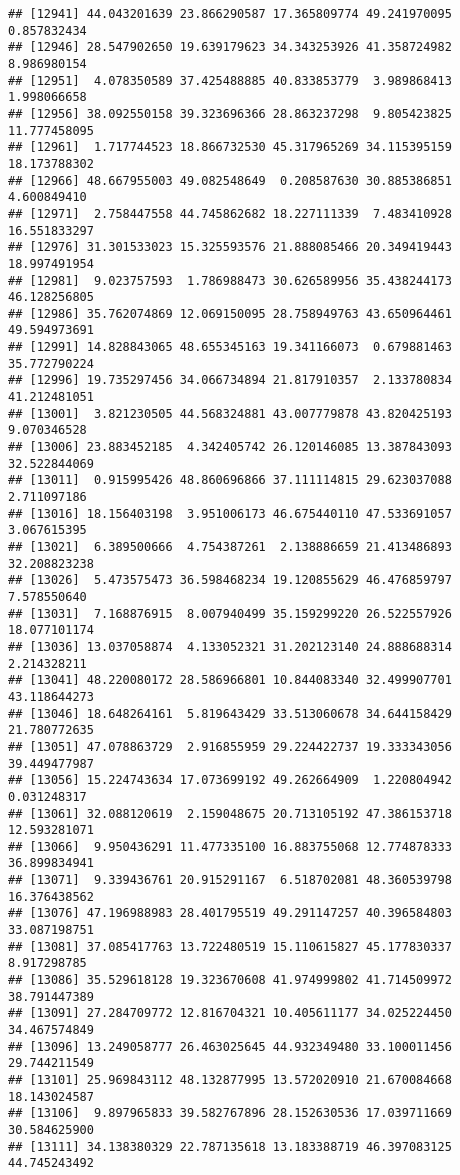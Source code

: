\documentclass[
]{article}
\begin{document}
\begin{verbatim}
## [12941] 44.043201639 23.866290587 17.365809774 49.241970095  0.857832434
## [12946] 28.547902650 19.639179623 34.343253926 41.358724982  8.986980154
## [12951]  4.078350589 37.425488885 40.833853779  3.989868413  1.998066658
## [12956] 38.092550158 39.323696366 28.863237298  9.805423825 11.777458095
## [12961]  1.717744523 18.866732530 45.317965269 34.115395159 18.173788302
## [12966] 48.667955003 49.082548649  0.208587630 30.885386851  4.600849410
## [12971]  2.758447558 44.745862682 18.227111339  7.483410928 16.551833297
## [12976] 31.301533023 15.325593576 21.888085466 20.349419443 18.997491954
## [12981]  9.023757593  1.786988473 30.626589956 35.438244173 46.128256805
## [12986] 35.762074869 12.069150095 28.758949763 43.650964461 49.594973691
## [12991] 14.828843065 48.655345163 19.341166073  0.679881463 35.772790224
## [12996] 19.735297456 34.066734894 21.817910357  2.133780834 41.212481051
## [13001]  3.821230505 44.568324881 43.007779878 43.820425193  9.070346528
## [13006] 23.883452185  4.342405742 26.120146085 13.387843093 32.522844069
## [13011]  0.915995426 48.860696866 37.111114815 29.623037088  2.711097186
## [13016] 18.156403198  3.951006173 46.675440110 47.533691057  3.067615395
## [13021]  6.389500666  4.754387261  2.138886659 21.413486893 32.208823238
## [13026]  5.473575473 36.598468234 19.120855629 46.476859797  7.578550640
## [13031]  7.168876915  8.007940499 35.159299220 26.522557926 18.077101174
## [13036] 13.037058874  4.133052321 31.202123140 24.888688314  2.214328211
## [13041] 48.220080172 28.586966801 10.844083340 32.499907701 43.118644273
## [13046] 18.648264161  5.819643429 33.513060678 34.644158429 21.780772635
## [13051] 47.078863729  2.916855959 29.224422737 19.333343056 39.449477987
## [13056] 15.224743634 17.073699192 49.262664909  1.220804942  0.031248317
## [13061] 32.088120619  2.159048675 20.713105192 47.386153718 12.593281071
## [13066]  9.950436291 11.477335100 16.883755068 12.774878333 36.899834941
## [13071]  9.339436761 20.915291167  6.518702081 48.360539798 16.376438562
## [13076] 47.196988983 28.401795519 49.291147257 40.396584803 33.087198751
## [13081] 37.085417763 13.722480519 15.110615827 45.177830337  8.917298785
## [13086] 35.529618128 19.323670608 41.974999802 41.714509972 38.791447389
## [13091] 27.284709772 12.816704321 10.405611177 34.025224450 34.467574849
## [13096] 13.249058777 26.463025645 44.932349480 33.100011456 29.744211549
## [13101] 25.969843112 48.132877995 13.572020910 21.670084668 18.143024587
## [13106]  9.897965833 39.582767896 28.152630536 17.039711669 30.584625900
## [13111] 34.138380329 22.787135618 13.183388719 46.397083125 44.745243492

\end{verbatim}
\end{document}

